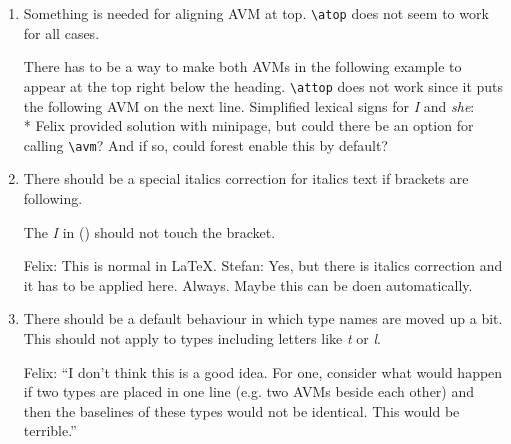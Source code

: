 \documentclass[output=book
		,modfonts
		,nonflat
	        ,collection
	        ,collectionchapter
	        ,collectiontoclongg
 	        ,biblatex  
                ,babelshorthands
                ,newtxmath
                ,colorlinks, citecolor=brown 
                ,draftmode
		  ]{langscibook}
\begin{document}
\begin{enumerate}
\item 
Something is needed for aligning AVM at top. \verb+\atop+ does not seem to work for all cases.

There has to be a way to make both AVMs in the following example to appear at the top right below the heading. \verb+\attop+ does not work since it puts the following AVM on the next line.
\ea
\label{entryfori}
Simplified lexical signs for  \textit{I} and \textit{she}: \\*
\hspace{1cm}
\z
Felix provided solution with minipage, but could there be an option for calling \verb+\avm+? And if
so, could forest enable this by default?


\item 

There should be a special italics correction for italics text if brackets are following.

The \emph{I} in () should not touch the bracket.

\ea
{}
\z

Felix: This is normal in \LaTeX. Stefan: Yes, but there is italics correction and it has to be
applied here. Always. Maybe this can be doen automatically.


\item 
There should be a default behaviour in which type names are moved up a bit. This should not apply to types including letters like \emph{t} or \emph{l}.

\ea
\z

Felix: ``I don't think this is a good idea. For one, consider what would happen if two types are
placed in one line (e.g. two AVMs beside each other) and then the baselines of these types would not
be identical. This would be terrible.''


\end{enumerate}
\end{document}
